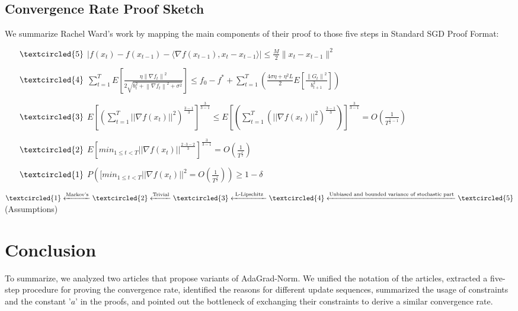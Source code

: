 \documentclass[14pt,onecolumn,letterpaper]{extarticle}
\begin{document}
\subsection{Convergence Rate Proof Sketch}
We summarize Rachel Ward's work
 by mapping the main components of their proof to those five steps in Standard SGD Proof Format:\\
 \begin{enumerate}
    \item [$\textcircled{5}$] $|f(x_t)-f(x_{t-1})-\langle\nabla f(x_{t-1}), x_t-x_{t-1}\rangle| \leq \frac{M}{2}\|x_t-x_{t-1}\|^2$
    \item [$\textcircled{4}$] $\sum_{t=1}^{T}E\left[\frac{\eta\left\|\nabla f_t\right\|^2}{2 \sqrt{b_t^2+\left\|\nabla f_t\right\|^2+\sigma^2}}\right] 
    \leq f_0-f^*+\sum_{t=1}^{T}\left(\frac{4 \sigma\eta+\eta^2 L}{2} E\left[\frac{\left\|G_t\right\|^2}{b_{t+1}^2}\right]\right)$\\
    \item [$\textcircled{3}$] 
    $E\left[\left(\sum_{t=1}^{T}||\nabla f(x_t)||^2\right)^{\frac{3-1}{3}}\right]^{\frac{3}{3-1}}
    \leq E\left[\left(\sum_{t=1}^{T}\left(||\nabla f(x_t)||^2\right)^{\frac{3-1}{3}}\right)\right]^{\frac{3}{3-1}}
    = O(\frac{1}{T^{\frac{1}{2} - 1}})$
    \item [$\textcircled{2}$] $E[min_{1 \leq t < T}||\nabla f(x_t)||^{\frac{2\cdot3-2}{3}}]^{\frac{3}{3-1}} = O(\frac{1}{T^{\frac{1}{2}}})$
    \item [$\textcircled{1}$] $P([min_{1 \leq t < T}||\nabla f(x_t)||^2 = O(\frac{1}{T^\frac{1
    }{2}})) \geq 1 - \delta$\\\par
\end{enumerate} \par
$\textcircled{1} \xleftarrow{\text{Markov's}} \textcircled{2} \xleftarrow{\text{Trivial}} \textcircled{3} \xleftarrow{\text{ L-Lipschitz }} \textcircled{4} \xleftarrow{\text{Unbiased and bounded variance of stochastic part}} \textcircled{5}$(Assumptions)
\section{Conclusion}
To summarize, we analyzed two articles that propose variants of AdaGrad-Norm. We unified the notation of the articles, extracted a five-step procedure for proving the convergence rate, identified the reasons for different update sequences, summarized the usage of constraints and the constant '$a$' in the proofs, and pointed out the bottleneck of exchanging their constraints to derive a similar convergence rate. 
\end{document}
